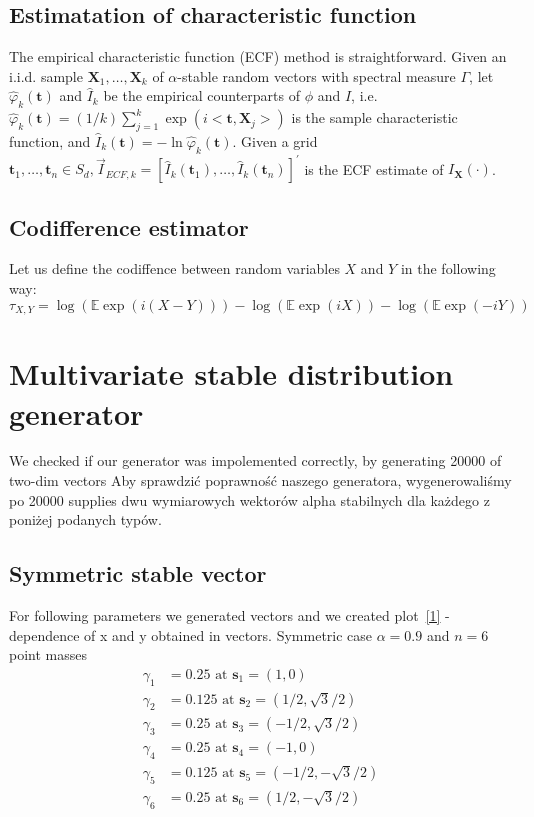 \documentclass{article}
\begin{document}
	\subsection{Estimatation of characteristic function} \label{teoCF}
	The empirical characteristic function (ECF) method is straightforward. Given an i.i.d. sample $\mathbf{X}_1, \ldots, \mathbf{X}_k$ of $\alpha$-stable random vectors with spectral measure $\Gamma$, let $\widehat{\varphi}_k(\mathbf{t})$ and $\widehat{I}_k$ be the empirical counterparts of $\phi$ and $I$, i.e. $\widehat{\varphi}_k(\mathbf{t})=(1 / k) \sum_{j=1}^k \exp \left(i<\mathbf{t}, \mathbf{X}_j>\right)$ is the sample characteristic function, and $\widehat{I}_k(\mathbf{t})=-\ln \widehat{\varphi}_k(\mathbf{t})$. Given a grid $\mathbf{t}_1, \ldots, \mathbf{t}_n \in S_d, \vec{I}_{E C F, k}=\left[\hat{I}_k\left(\mathbf{t}_1\right), \ldots, \hat{I}_k\left(\mathbf{t}_n\right)\right]^{\prime}$ is the ECF estimate of $I_{\mathbf{X}}(\cdot)$.
	
	\subsection{Codifference estimator}
	Let us define the codiffence between random variables $X$ and $Y$ in the following way:
	$$
	\tau_{X, Y}=\log (\mathbb{E} \exp (i(X-Y)))-\log (\mathbb{E} \exp (i X))-\log (\mathbb{E} \exp (-i Y))
	$$
	\section{Multivariate stable distribution generator}

	We checked if our generator was impolemented correctly, by generating 20000 of two-dim vectors
	Aby sprawdzić poprawność naszego generatora, wygenerowaliśmy po 20000 supplies dwu wymiarowych wektorów alpha stabilnych dla każdego z poniżej podanych typów.
	
	\subsection{Symmetric stable vector}
	For following parameters we generated vectors and we created plot~\ref{1} - dependence of x and y obtained in vectors.
	Symmetric case $\alpha=0.9$ and $n=6$ point masses
	$$
	\begin{aligned}
		\gamma_1 & =0.25 \text { at } \mathbf{s}_1=(1,0) \\
		\gamma_2 & =0.125 \text { at } \mathbf{s}_2=(1 / 2, \sqrt{3} / 2) \\
		\gamma_3 & =0.25 \text { at } \mathbf{s}_3=(-1 / 2, \sqrt{3} / 2) \\
		\gamma_4 & =0.25 \text { at } \mathbf{s}_4=(-1,0) \\
		\gamma_5 & =0.125 \text { at } \mathbf{s}_5=(-1 / 2,-\sqrt{3} / 2) \\
		\gamma_6 & =0.25 \text { at } \mathbf{s}_6=(1 / 2,-\sqrt{3} / 2)
	\end{aligned}
	$$
	
\end{document}
